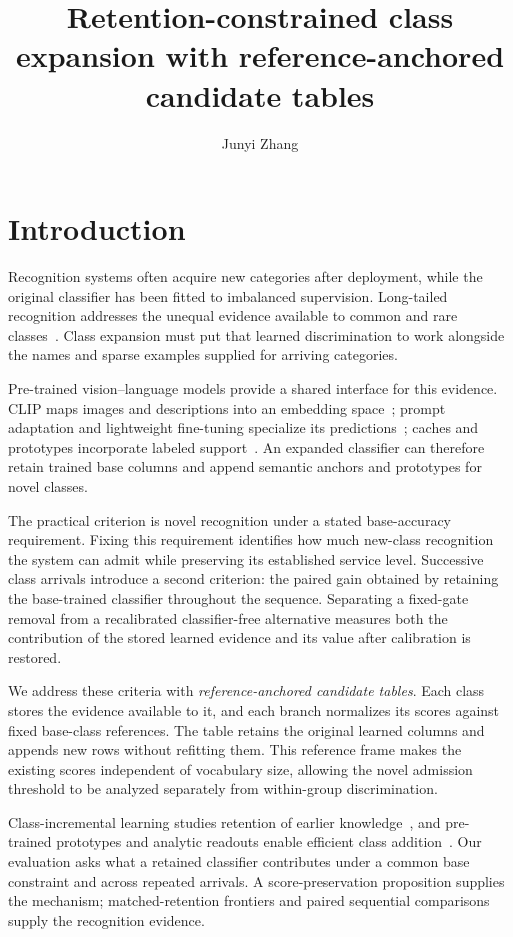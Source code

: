 \documentclass[research]{fcs}
\title{Retention-constrained class expansion with reference-anchored candidate tables}
\author[1]{Junyi Zhang}
\begin{document}
\section{Introduction}
Recognition systems often acquire new categories after deployment, while the original classifier has been fitted to imbalanced supervision. Long-tailed recognition addresses the unequal evidence available to common and rare classes~\cite{liu2019large,cao2019ldam,cui2019classbalanced}. Class expansion must put that learned discrimination to work alongside the names and sparse examples supplied for arriving categories.

Pre-trained vision--language models provide a shared interface for this evidence. CLIP maps images and descriptions into an embedding space~\cite{radford2021clip}; prompt adaptation and lightweight fine-tuning specialize its predictions~\cite{zhou2022coop,zhou2022cocoop,shi2024lift}; caches and prototypes incorporate labeled support~\cite{zhang2022tipadapter,snell2017prototypical,wang2019simpleshot}. An expanded classifier can therefore retain trained base columns and append semantic anchors and prototypes for novel classes.

The practical criterion is novel recognition under a stated base-accuracy requirement. Fixing this requirement identifies how much new-class recognition the system can admit while preserving its established service level. Successive class arrivals introduce a second criterion: the paired gain obtained by retaining the base-trained classifier throughout the sequence. Separating a fixed-gate removal from a recalibrated classifier-free alternative measures both the contribution of the stored learned evidence and its value after calibration is restored.

We address these criteria with \emph{reference-anchored candidate tables}. Each class stores the evidence available to it, and each branch normalizes its scores against fixed base-class references. The table retains the original learned columns and appends new rows without refitting them. This reference frame makes the existing scores independent of vocabulary size, allowing the novel admission threshold to be analyzed separately from within-group discrimination.

Class-incremental learning studies retention of earlier knowledge~\cite{rebuffi2017icarl,tao2020fewshot}, and pre-trained prototypes and analytic readouts enable efficient class addition~\cite{zhou2024simplecil,mcdonnell2023ranpac}. Our evaluation asks what a retained classifier contributes under a common base constraint and across repeated arrivals. A score-preservation proposition supplies the mechanism; matched-retention frontiers and paired sequential comparisons supply the recognition evidence.
\end{document}

